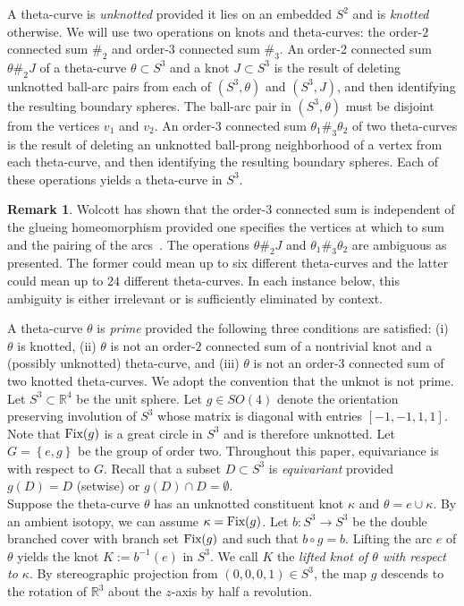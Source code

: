\documentclass{amsart}
\numberwithin{equation}{section}
\theoremstyle{definition}
\newtheorem{remark}[theorem]{Remark}
\def\R{\ensuremath{\mathbb{R}}}
\newcommand{\cpa}[1]{\left\{#1\right\}}
\newcommand{\tn}[1]{\textnormal{#1}}
\newcommand{\br}[1]{\left[#1\right]}
\begin{document}
A theta-curve is \emph{unknotted} provided it lies on an embedded $S^2$ and is \emph{knotted} otherwise.
We will use two operations on knots and theta-curves: the order-$2$ connected sum $\#_2$ and order-$3$ connected sum $\#_3$.
An order-2 connected sum $\theta\#_2 J$ of a theta-curve $\theta\subset S^3$ and a knot $J\subset S^3$ is the result of deleting unknotted ball-arc pairs from each of $(S^3,\theta)$ and $(S^3,J)$, and then identifying the resulting boundary spheres.
The ball-arc pair in $(S^3,\theta)$ must be disjoint from the vertices $v_1$ and $v_2$.
An order-3 connected sum $\theta_1\#_3\theta_2$ of two theta-curves is the result of deleting an unknotted ball-prong neighborhood of a vertex from each theta-curve, and then identifying the resulting boundary spheres.
Each of these operations yields a theta-curve in $S^3$.\\

\begin{remark}
Wolcott has shown that the order-$3$ connected sum is independent of the glueing homeomorphism provided one specifies the vertices at which to sum and the pairing of the arcs~\cite{Wol87}.
The operations $\theta\#_2 J$ and $\theta_1\#_3\theta_2$ are ambiguous as presented. The former could mean up to six different theta-curves and the latter could mean up to $24$ different theta-curves. In each instance below, this ambiguity is either irrelevant or is sufficiently eliminated by context.
\end{remark}

A theta-curve $\theta$ is \emph{prime} provided the following three conditions are satisfied:
(i) $\theta$ is knotted,
(ii) $\theta$ is not an order-$2$ connected sum of a nontrivial knot and a (possibly unknotted) theta-curve, and
(iii) $\theta$ is not an order-$3$ connected sum of two knotted theta-curves.
We adopt the convention that the unknot is not prime.\\

Let $S^3\subset\R^4$ be the unit sphere. Let $g\in SO(4)$ denote the orientation preserving involution of $S^3$ whose matrix is diagonal with entries $\br{-1,-1,1,1}$.
Note that $\tn{Fix}(g)$ is a great circle in $S^3$ and is therefore unknotted.
Let $G=\cpa{e,g}$ be the group of order two.
Throughout this paper, equivariance is with respect to $G$.
Recall that a subset $D\subset S^3$ is \emph{equivariant} provided $g(D)=D$ (setwise) or $g(D)\cap D = \emptyset$.\\

Suppose the theta-curve $\theta$ has an unknotted constituent knot $\kappa$ and $\theta=e\cup\kappa$.
By an ambient isotopy, we can assume $\kappa=\tn{Fix}(g)$.
Let $b:S^3\to S^3$ be the double branched cover with branch set $\tn{Fix}(g)$ and such that $b\circ g = b$.
Lifting the arc $e$ of $\theta$ yields the knot $K:=b^{-1}(e)$ in $S^3$.
We call $K$ the \emph{lifted knot of $\theta$ with respect to $\kappa$}.
By stereographic projection from $(0,0,0,1)\in S^3$, the map $g$ descends to the rotation of $\R^3$ about the $z$-axis by half a revolution.\\
\end{document}
